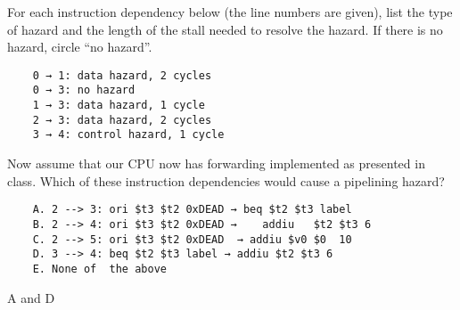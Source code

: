 \begin{blocksection}
\question
For each instruction dependency below (the line numbers are given), list the type of hazard and the length of the stall needed to resolve the hazard. If there is no hazard, circle “no hazard”.
\begin{solution}
    \begin{verbatim}
    0 → 1: data hazard, 2 cycles
    0 → 3: no hazard
    1 → 3: data hazard, 1 cycle
    2 → 3: data hazard, 2 cycles
    3 → 4: control hazard, 1 cycle
    \end{verbatim}
\end{solution}



\question
Now assume that our CPU now has forwarding implemented as presented in class. Which of these instruction dependencies would cause a pipelining hazard?
\begin{verbatim}
    A. 2 --> 3: ori $t3 $t2 0xDEAD → beq $t2 $t3 label
    B. 2 --> 4: ori	$t3	$t2	0xDEAD →	addiu	$t2	$t3	6
    C. 2 --> 5: ori	$t3	$t2	0xDEAD	→ addiu	$v0	$0	10
    D. 3 --> 4: beq $t2 $t3 label → addiu $t2 $t3 6
    E. None	of	the	above
\end{verbatim}
\begin{solution}
A and D
\end{solution}

\end{blocksection}